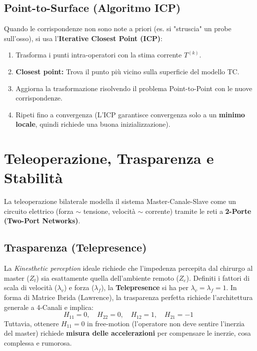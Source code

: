 \documentclass[11pt,a4paper,twoside]{report}
\begin{document}
\section{Point-to-Surface (Algoritmo ICP)}
Quando le corrispondenze non sono note a priori (es. si "struscia" un probe sull'osso), si usa l'\textbf{Iterative Closest Point (ICP)}:
\begin{enumerate}
    \item Trasforma i punti intra-operatori con la stima corrente $T^{(k)}$.
    \item \textbf{Closest point:} Trova il punto più vicino sulla superficie del modello TC.
    \item Aggiorna la trasformazione risolvendo il problema Point-to-Point con le nuove corrispondenze.
    \item Ripeti fino a convergenza (L'ICP garantisce convergenza solo a un \textbf{minimo locale}, quindi richiede una buona inizializzazione).
\end{enumerate}


\chapter{Teleoperazione, Trasparenza e Stabilità}

La teleoperazione bilaterale modella il sistema Master-Canale-Slave come un circuito elettrico (forza $\sim$ tensione, velocità $\sim$ corrente) tramite le reti a \textbf{2-Porte (Two-Port Networks)}.

\section{Trasparenza (Telepresence)}
La \textit{Kinesthetic perception} ideale richiede che l'impedenza percepita dal chirurgo al master ($Z_t$) sia esattamente quella dell'ambiente remoto ($Z_e$). 
Definiti i fattori di scala di velocità ($\lambda_v$) e forza ($\lambda_f$), la \textbf{Telepresence} si ha per $\lambda_v = \lambda_f = 1$. In forma di Matrice Ibrida (Lawrence), la trasparenza perfetta richiede l'architettura generale a 4-Canali e implica:
\begin{equation}
    H_{11} = 0, \quad H_{22} = 0, \quad H_{12} = 1, \quad H_{21} = -1
\end{equation}
Tuttavia, ottenere $H_{11}=0$ in free-motion (l'operatore non deve sentire l'inerzia del master) richiede \textbf{misura delle accelerazioni} per compensare le inerzie, cosa complessa e rumorosa.
\end{document}
